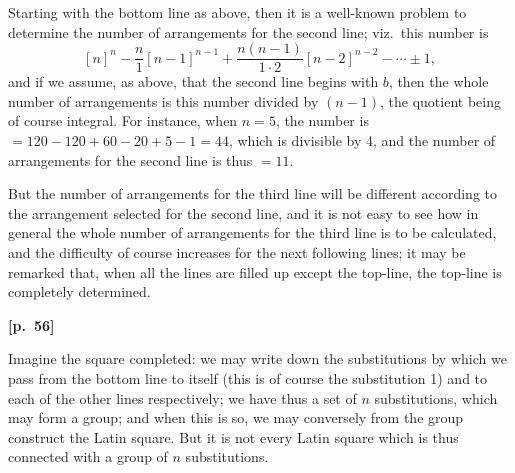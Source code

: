 \documentclass[11pt,a4paper]{book}
\begin{document}
Starting with the bottom line as above, then it is a well-known problem to determine the number of arrangements for the second line; viz.\ this number is
$$
[n]^n - \frac{n}{1}[n-1]^{n-1} + \frac{n(n-1)}{1 \cdot 2}[n-2]^{n-2} - \cdots \pm 1,
$$
and if we assume, as above, that the second line begins with $b$, then the whole number of arrangements is this number divided by $(n - 1)$, the quotient being of course integral. For instance, when $n = 5$, the number is $= 120 - 120 + 60 - 20 + 5 - 1 = 44$, which is divisible by 4, and the number of arrangements for the second line is thus $= 11$.

But the number of arrangements for the third line will be different according to the arrangement selected for the second line, and it is not easy to see how in general the whole number of arrangements for the third line is to be calculated, and the difficulty of course increases for the next following lines; it may be remarked that, when all the lines are filled up except the top-line, the top-line is completely determined.

\vspace{0.5em}
\noindent\textbf{[p.\ 56]}

Imagine the square completed: we may write down the substitutions by which we pass from the bottom line to itself (this is of course the substitution 1) and to each of the other lines respectively; we have thus a set of $n$ substitutions, which may form a group; and when this is so, we may conversely from the group construct the Latin square. But it is not every Latin square which is thus connected with a group of $n$ substitutions.
\end{document}
